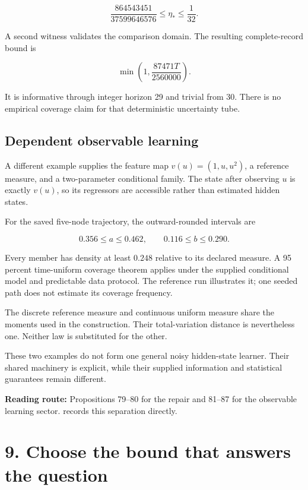 \documentclass[11pt,letterpaper]{article}
\begin{document}
\[
\frac{864543451}{37599646576}\leq\eta_*\leq\frac1{32}.
\]

A second witness validates the comparison domain. The resulting
complete-record bound is

\[
\min\left(1,\frac{87471T}{2560000}\right).
\]

It is informative through integer horizon 29 and trivial from 30. There
is no empirical coverage claim for that deterministic uncertainty tube.

\subsection{Dependent observable
learning}\label{dependent-observable-learning}

A different example supplies the feature map \(v(u)=(1,u,u^2)\), a
reference measure, and a two-parameter conditional family. The state
after observing \(u\) is exactly \(v(u)\), so its regressors are
accessible rather than estimated hidden states.

For the saved five-node trajectory, the outward-rounded intervals are

\[
0.356\leq a\leq0.462,\qquad 0.116\leq b\leq0.290.
\]

Every member has density at least \(0.248\) relative to its declared
measure. A 95 percent time-uniform coverage theorem applies under the
supplied conditional model and predictable data protocol. The reference
run illustrates it; one seeded path does not estimate its coverage
frequency.

The discrete reference measure and continuous uniform measure share the
moments used in the construction. Their total-variation distance is
nevertheless one. Neither law is substituted for the other.

These two examples do not form one general noisy hidden-state learner.
Their shared machinery is explicit, while their supplied information and
statistical guarantees remain different.

\textbf{Reading route:} Propositions 79--80 for the repair and 81--87
for the observable learning sector. 
records this separation directly.

\section{9. Choose the bound that answers the
question}\label{choose-the-bound-that-answers-the-question}
\end{document}

